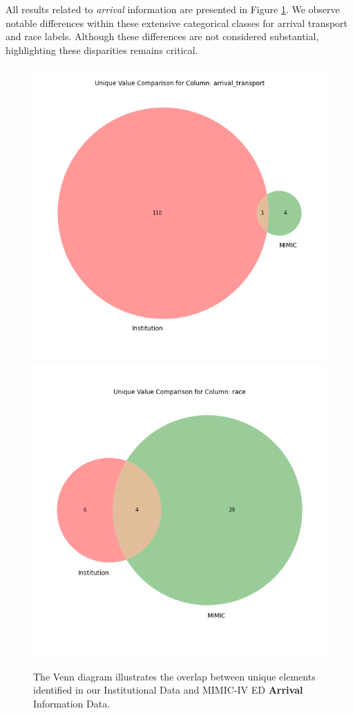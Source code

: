\documentclass[pmlr]{jmlr}%
\begin{document}
All results related to \textit{arrival} information are presented in Figure \ref{app1}. We observe notable differences within these extensive categorical classes for arrival transport and race labels. Although these differences are not considered substantial, highlighting these disparities remains critical.

\begin{figure}[h!]
   \centering 
   \includegraphics[width=4.5in]{plots/arrival_transport_venn.png} 
   \includegraphics[width=4.5in]{plots/race_venn.png} 
   \caption{The Venn diagram illustrates the overlap between unique elements identified in our Institutional Data and MIMIC-IV ED \textbf{Arrival} Information Data.}
   \label{app1} 
 \end{figure} 
\end{document}
